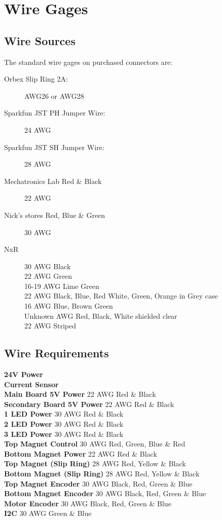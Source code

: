 \documentclass{article}
\begin{document}
\section{Wire Gages}
\subsection{Wire Sources}
The standard wire gages on purchased connectors are:
\begin{description}
\item[Orbex Slip Ring 2A:]
AWG26 or AWG28
\item[Sparkfun JST PH Jumper Wire:]
24 AWG
\item[Sparkfun JST SH Jumper Wire:]
28 AWG
\item[Mechatronics Lab Red \& Black]
22 AWG
\item[Nick's stores Red, Blue \& Green]
30 AWG
\item[NxR]
30 AWG Black\\
22 AWG Green\\
16-19 AWG Lime Green\\
22 AWG Black, Blue, Red White, Green, Orange in Grey case\\
16 AWG Blue, Brown Green\\
Unknown AWG Red, Black, White shielded clear\\
22 AWG Striped
\end{description}
\subsection{Wire Requirements}
\textbf{24V Power}\\
\textbf{Current Sensor}\\
\textbf{Main Board 5V Power} 22 AWG Red \& Black\\
\textbf{Secondary Board 5V Power} 22 AWG Red \& Black\\
\textbf{1 LED Power} 30 AWG Red \& Black\\
\textbf{2 LED Power} 30 AWG Red \& Black\\
\textbf{3 LED Power} 30 AWG Red \& Black\\
\textbf{Top Magnet Control} 30 AWG Red, Green, Blue \& Red\\
\textbf{Bottom Magnet Power} 22 AWG Red \& Black\\
\textbf{Top Magnet (Slip Ring)} 28 AWG Red, Yellow \& Black\\
\textbf{Bottom Magnet (Slip Ring)} 28 AWG Red, Yellow \& Black\\
\textbf{Top Magnet Encoder} 30 AWG Black, Red, Green \& Blue\\
\textbf{Bottom Magnet Encoder} 30 AWG Black, Red, Green \& Blue\\
\textbf{Motor Encoder} 30 AWG Black, Red, Green \& Blue\\
\textbf{I2C} 30 AWG Green \& Blue\\
\end{document}
